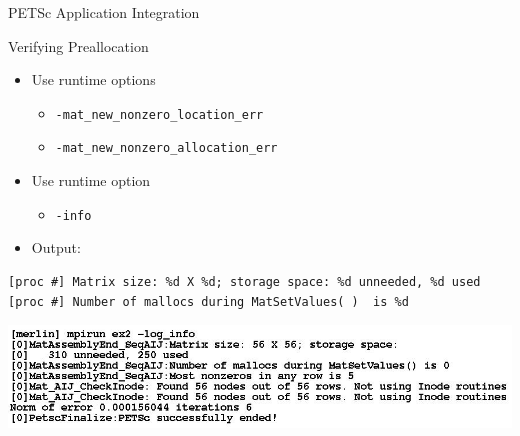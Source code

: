 \begin{frame}[fragile]{PETSc Application Integration}

\begin{block}{Verifying Preallocation}
\begin{itemize}
  \item Use runtime options 
    \begin{itemize}
      \item \lstinline|-mat_new_nonzero_location_err| 
      \item \lstinline|-mat_new_nonzero_allocation_err|
    \end{itemize}
    
  \item Use runtime option
    \begin{itemize} \item \lstinline|-info| \end{itemize}
  \item Output: \\
\end{itemize}

\end{block}
\begin{lstlisting}[basicstyle=\scriptsize]
[proc #] Matrix size: %d X %d; storage space: %d unneeded, %d used
[proc #] Number of mallocs during MatSetValues( )  is %d
\end{lstlisting}

\begin{center}
\includegraphics[width=4.in]{figures/logInfoOutput}
\end{center}
\end{frame}

